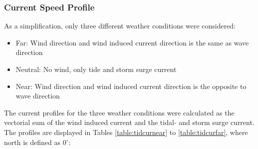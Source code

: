    \subsubsection{Current Speed Profile}
  As a simplification, only three different weather conditions were considered: 
  \begin{itemize}
      \item Far: Wind direction and wind induced current direction is the same as wave direction
     \item Neutral: No wind, only tide and storm surge current
     \item Near:  Wind direction and wind induced current direction is the opposite to wave direction
  \end{itemize}
 The current profiles for the three weather conditions were calculated as the vectorial sum of the wind induced current and the tidal- and storm surge current. The profiles are displayed in Tables \ref{table:tidcurnear} to \ref{table:tidcurfar}, where north is defined as 0$^{\circ}$:  

